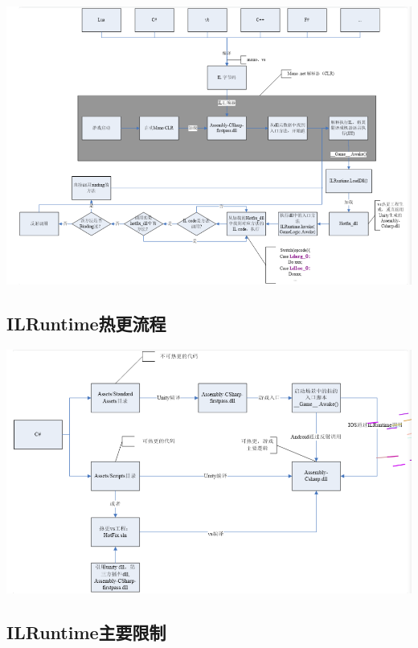 \documentclass[9pt, b5paper]{article}
\begin{document}
\includegraphics[width=.9\linewidth]{./pic/readme_20220926_094936.png}

\subsection{ILRuntime热更流程}
\label{sec-7-2}

\includegraphics[width=.9\linewidth]{./pic/readme_20220926_095022.png}
\subsection{ILRuntime主要限制}
\label{sec-7-3}
\end{document}

